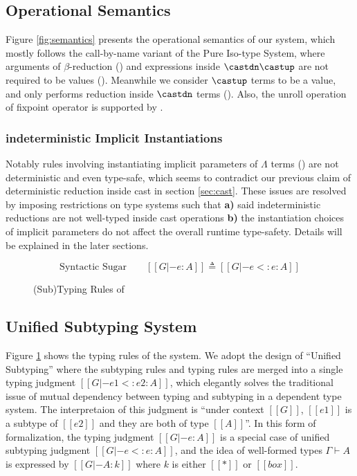 \subsection{Operational Semantics}

Figure \ref{fig:semantics} presents the operational semantics of our system,
which mostly follows the call-by-name variant of the Pure Iso-type System\cite{yang2019pure},
where arguments of $\beta$-reduction () and expressions inside $\castdn \castup$
are not required to be values (). Meanwhile we consider $\castup$ terms to be a value,
and only performs reduction inside $\castdn$ terms (). Also, the unroll
operation of fixpoint operator is supported by .

\subsubsection{indeterministic Implicit Instantiations}

Notably rules involving instantiating implicit parameters of $\Lambda$ terms
() are not deterministic and even type-safe, which seems to
contradict our previous claim of deterministic reduction inside cast in section \ref{sec:cast}.
These issues are resolved by imposing restrictions on type systems such that
\textbf{a)} said indeterministic reductions are not well-typed inside cast operations
\textbf{b)} the instantiation choices of implicit parameters do not affect the
overall runtime type-safety.
Details will be explained in the later sections.

\begin{figure}
    \centering

    \begin{equation*}
       \text{Syntactic Sugar} \qquad [[G |- e : A]] \triangleq [[G |- e <: e : A]]
    \end{equation*}
    \caption{(Sub)Typing Rules of \system}
    \label{fig:typing}
\end{figure}

\subsection{Unified Subtyping System}

Figure \ref{fig:typing} shows the typing rules of the system. We adopt the design
of ``Unified Subtyping''\cite{yang2017unifying} where the subtyping rules and
typing rules are merged into a single typing judgment $[[G |- e1 <: e2 : A]]$,
which elegantly solves the traditional issue of mutual dependency between typing
and subtyping in a dependent type system.
The interpretaion of this judgment is ``under context $[[G]]$, $[[e1]]$ is a
subtype of $[[e2]]$ and they are both of type $[[A]]$''.
In this form of formalization, the typing judgment $[[G |- e : A]]$ is a
special case of unified subtyping judgment $[[G |- e <: e : A]]$,
and the idea of well-formed types $\Gamma \vdash A$ is expressed by
$[[G |- A : k]]$ where $k$ is either $[[*]]$ or $[[box]]$.


